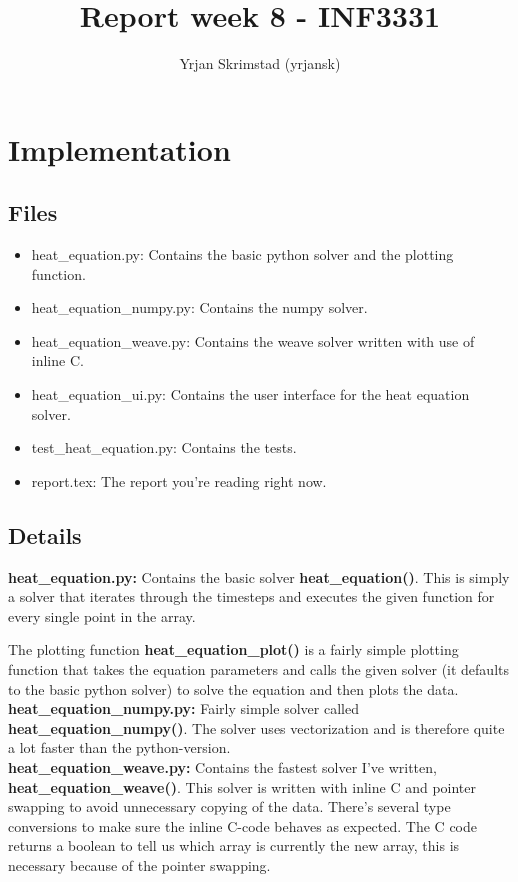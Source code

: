 \documentclass[]{article}
\title{Report week 8 - INF3331}
\author{Yrjan Skrimstad (yrjansk)}
\begin{document}
\maketitle
\section{Implementation}
\subsection{Files}
\begin{itemize}
	\item heat\_equation.py: Contains the basic python solver and the plotting
		function.
	\item heat\_equation\_numpy.py: Contains the numpy solver.
	\item heat\_equation\_weave.py: Contains the weave solver written with use
		of inline C.
	\item heat\_equation\_ui.py: Contains the user interface for the heat
		equation solver.
	\item test\_heat\_equation.py: Contains the tests.
	\item report.tex: The report you're reading right now.
\end{itemize}
\subsection{Details}
\textbf{heat\_equation.py:}
Contains the basic solver \textbf{heat\_equation()}. This is simply a solver
that iterates through the timesteps and executes the given function for every
single point in the array.

The plotting function \textbf{heat\_equation\_plot()}
is a fairly simple plotting function that takes the equation parameters and
calls the given solver (it defaults to the basic python solver) to solve the
equation and then plots the data.\\

\noindent\textbf{heat\_equation\_numpy.py:}
Fairly simple solver called \textbf{heat\_equation\_numpy()}. The
solver uses vectorization and is therefore quite a lot faster than the
python-version.\\

\noindent\textbf{heat\_equation\_weave.py:}
Contains the fastest solver I've written, \\\textbf{heat\_equation\_weave()}.
This solver is written with inline C and pointer swapping to avoid unnecessary
copying of the data. There's several type conversions to make sure the inline
C-code behaves as expected. The C code returns a boolean to tell us which array
is currently the new array, this is necessary because of the pointer swapping.\\
\end{document}
